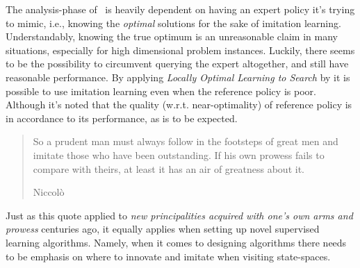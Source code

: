 The analysis-phase of \Alice\ is heavily dependent on having an expert 
policy it's trying to mimic, i.e., knowing the \emph{optimal} solutions for the 
sake of imitation learning. 
Understandably, knowing the true optimum is an unreasonable claim in many 
situations, especially for high dimensional problem instances. 
Luckily, there seems to be the possibility to circumvent querying the expert 
altogether, and still have reasonable performance. 
By applying \emph{Locally Optimal Learning to Search} by \citet{ChangKADL15} it 
is possible to use imitation learning even when the reference policy is poor. 
Although it's noted that the quality (w.r.t. near-optimality) of reference 
policy is in accordance to its performance, as is to be expected. 

\vfill
\begin{quote}
    So a prudent man must always follow in the footsteps of great men and 
    imitate those who have been outstanding. If his own prowess fails to 
    compare with theirs, at least it has an air of greatness about it. 
    
    \raggedleft Niccolò \cite{Maachiavelli}
\end{quote}
Just as this quote applied to \emph{new principalities acquired with one's own 
    arms and prowess} centuries ago, it equally applies when setting up novel 
supervised learning algorithms. 
Namely, when it comes to designing algorithms there needs to be emphasis on 
where to innovate and imitate when visiting state-spaces. 
\vfill
\vfill